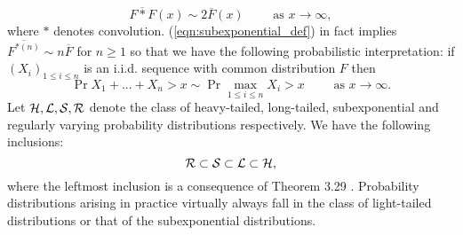 \begin{equation}\label{eqn:subexponential_def}
\overline{F * F} (x) \sim 2 \overline{F}(x) \qquad\text{ as } x \to \infty, 
\end{equation}
where $*$ denotes convolution. (\ref{eqn:subexponential_def}) in fact implies $\overline{F^{* (n)}} \sim n \overline{F}$ for $n \geq 1$ so that we have the following probabilistic interpretation: if $(X_i)_{1 \leq i \leq n}$ is an i.i.d. sequence with common distribution $F$ then 
\begin{equation}\nonumber
\Pr{X_1 + ... + X_n > x} \sim \Pr{\max\limits_{1 \leq i \leq n} X_i > x} \qquad\text{ as } x \to \infty. 
\end{equation}
Let $\cal{H}, \cal{L}, \cal{S}, \cal{R}$ denote the class of heavy-tailed, long-tailed, subexponential and regularly varying probability distributions respectively. We have the following inclusions:
\begin{equation}\nonumber
\cal{R} \subset \cal{S} \subset \cal{L} \subset \cal{H}, 
\end{equation}
where the leftmost inclusion is a consequence of Theorem 3.29 \cite{foss2011introduction}. Probability distributions arising in practice virtually always fall in the class of light-tailed distributions or that of the subexponential distributions.  








